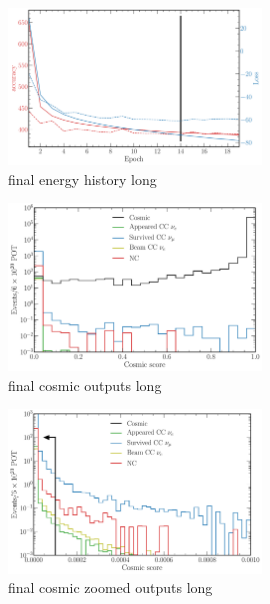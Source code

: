 \begin{figure} %
    \includegraphics[width=0.6\textwidth]{diagrams/7-cvn/chipsnet/final_energy_history.pdf}
    \caption[final energy history short]
    {final energy history long}
    \label{fig:final_energy_history}
\end{figure}

\begin{figure} %
    \includegraphics[width=0.6\textwidth]{diagrams/7-cvn/chipsnet/final_cosmic_outputs.pdf}
    \caption[final cosmic outputs short]
    {final cosmic outputs long}
    \label{fig:final_cosmic_outputs}
\end{figure}

\begin{figure} %
    \includegraphics[width=0.6\textwidth]{diagrams/7-cvn/chipsnet/final_cosmic_zoomed_outputs.pdf}
    \caption[final cosmic zoomed outputs short]
    {final cosmic zoomed outputs long}
    \label{fig:final_cosmic_zoomed_outputs}
\end{figure}

